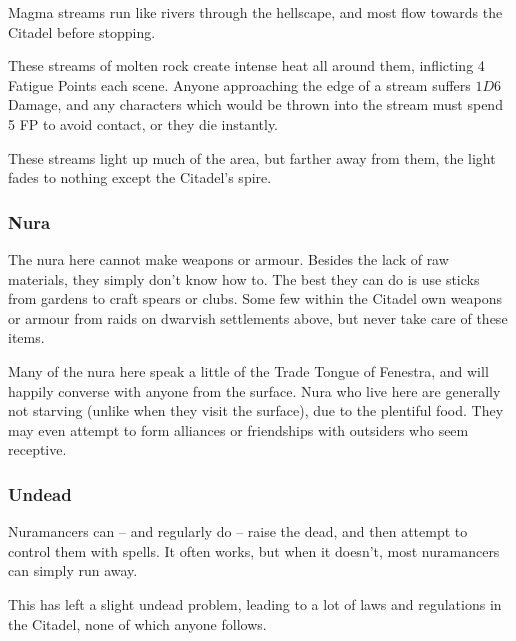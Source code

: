 \begin{multicols}{2}
Magma streams run like rivers through the hellscape, and most flow towards the Citadel before stopping.

These streams of molten rock create intense heat all around them, inflicting 4 Fatigue Points each scene.
Anyone approaching the edge of a stream suffers $1D6$ Damage, and any characters which would be thrown into the stream must spend 5 FP to avoid contact, or they die instantly.

These streams light up much of the area, but farther away from them, the light fades to nothing except the Citadel's spire.

\subsubsection{Nura}

The nura here cannot make weapons or armour.
Besides the lack of raw materials, they simply don't know how to.
The best they can do is use sticks from gardens to craft spears or clubs.
Some few within the Citadel own weapons or armour from raids on dwarvish settlements above, but never take care of these items.

Many of the nura here speak a little of the Trade Tongue of Fenestra, and will happily converse with anyone from the surface.
Nura who live here are generally not starving (unlike when they visit the surface), due to the plentiful food.
They may even attempt to form alliances or friendships with outsiders who seem receptive.


\label{deep_hobgoblin}

\encNura
{}

\subsubsection{Undead}

Nuramancers can -- and regularly do -- raise the dead, and then attempt to control them with spells.
It often works, but when it doesn't, most nuramancers can simply run away.

This has left a slight undead problem, leading to a lot of laws and regulations in the Citadel, none of which anyone follows.




\end{multicols}
